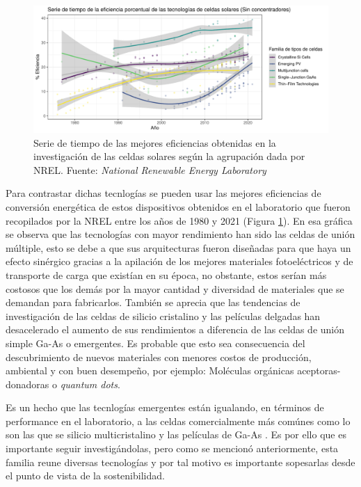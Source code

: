 \begin{figure}[h!]
    \begin{center}
        \includegraphics[scale=0.6]{img/familia_celdas.pdf}
    \end{center}
    \caption{Serie de tiempo de las mejores eficiencias obtenidas en la investigación de las celdas solares según la agrupación dada por NREL.
    Fuente: \textit{National Renewable Energy Laboratory} \cite{nrel}}
    \label{img:SerieTiempo}
\end{figure}

Para contrastar dichas tecnlogías se pueden usar las mejores eficiencias de conversión energética de estos dispositivos obtenidos en el laboratorio que fueron recopilados por la NREL entre los años de 1980 y 2021 (Figura \ref{img:SerieTiempo}). En esa gráfica se observa que las tecnologías con mayor rendimiento han sido las celdas de unión múltiple, esto se debe a que sus arquitecturas fueron diseñadas para que haya un efecto sinérgico gracias a la apilación de los mejores materiales fotoeléctricos y de transporte de carga que existían en su época, no obstante, estos serían más costosos que los demás por la mayor cantidad y diversidad de materiales que se demandan para fabricarlos. También se aprecia que las tendencias de investigación de las celdas de silicio cristalino y las películas delgadas han desacelerado el aumento de sus rendimientos a diferencia de las celdas de unión simple Ga-As o emergentes. Es probable que esto sea consecuencia del descubrimiento de nuevos materiales con menores costos de producción, ambiental y con buen desempeño, por ejemplo: Moléculas orgánicas aceptoras-donadoras o \textit{quantum dots}.


Es un hecho que las tecnlogías emergentes están igualando, en términos de performance en el laboratorio, a las celdas comercialmente más comúnes como lo son las que se silicio multicristalino y las películas de Ga-As \cite{chowdhury2020overview}. Es por ello que es importante seguir investigándolas, pero como se mencionó anteriormente, esta familia reune diversas tecnologías y por tal motivo es importante sopesarlas desde el punto de vista de la sostenibilidad.

